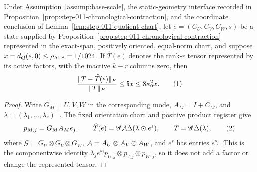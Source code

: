 \begin{lemma}\label{lem:step-012-residual-transfer}
Under Assumption~\ref{assump:base-scale}, the static-geometry
interface recorded in
Proposition~\ref{prop:step-011-chronological-contraction}, and the coordinate
conclusion of Lemma~\ref{lem:step-011-quotient-chart}, let
\(e=(C_U,C_V,C_W,s)\) be a state supplied by Proposition~\ref{prop:step-011-chronological-contraction} represented in
the exact-span, positively oriented, equal-norm chart, and suppose
\(x=d_Q(e,0)\le\rho_{\rm ALS}=1/1024\).  If \(\widehat T(e)\) denotes the
rank-\(r\) tensor represented by its active factors, with the inactive
\(k-r\) columns zero, then
\[
 { \|T-\widehat T(e)\|_F\over\|T\|_F}\le5x\le8\kappa_0^2x.
\tag{1}
\]

\begin{proof}
Write \(G_M=U,V,W\) in the corresponding mode,
\(A_M=I+C_M\), and \(\lambda=(\lambda_1,\ldots,\lambda_r)^\top\). The fixed orientation chart
and positive product register give
\[
 p_{M,j}=G_MA_Me_j,\qquad
 \widehat T(e)={\mathscr G}{\cal A}\Delta(\lambda\odot e^s),
 \qquad T={\mathscr G}\Delta(\lambda),
\tag{2}
\]
where \({\mathscr G}=G_U\otimes G_V\otimes G_W\),
\({\cal A}=A_U\otimes A_V\otimes A_W\), and \(e^s\) has entries \(e^{s_j}\).
This is the componentwise identity
\(\lambda_je^{s_j}p_{U,j}\otimes p_{V,j}\otimes p_{W,j}\), so it does not
add a factor or change the represented tensor.


\end{proof}
\end{lemma}
